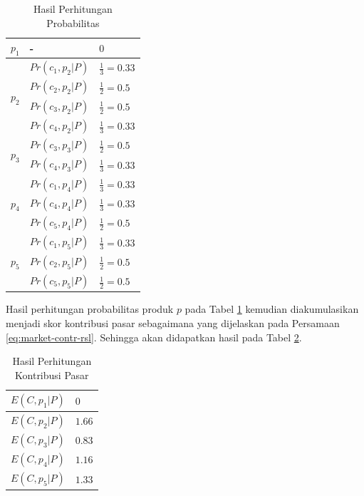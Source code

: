 \begin{small}
	\begin{longtable}{|p{1.5cm}|p{3cm}|p{2.5cm}|}
		\caption{Hasil Perhitungan Probabilitas}
		\label{tab:prob-res}
		\hline
		\multirow{1}{*}{$p_1$} & - & $0$ \\ \hline
		\multirow{4}{*}{$p_2$} & $Pr(c_1, p_2|P)$ & $\frac{1}{3} = 0.33$ \\ \cline{2-3}
		& $Pr(c_2, p_2|P)$ & $\frac{1}{2} = 0.5$ \\ \cline{2-3}
		& $Pr(c_3, p_2|P)$ & $\frac{1}{2} = 0.5$ \\ \cline{2-3}
		& $Pr(c_4, p_2|P)$ & $\frac{1}{3} = 0.33$  \\ \hline
		\multirow{2}{*}{$p_3$} & $Pr(c_3, p_3|P)$ & $\frac{1}{2} = 0.5$ \\ \cline{2-3}
		& $Pr(c_4, p_3|P)$ & $\frac{1}{3} = 0.33$  \\ \hline
		\multirow{3}{*}{$p_4$} & $Pr(c_1, p_4|P)$ & $\frac{1}{3} = 0.33$ \\ \cline{2-3}
		& $Pr(c_4, p_4|P)$ & $\frac{1}{3} = 0.33$  \\ \cline{2-3}
		& $Pr(c_5, p_4|P)$ & $\frac{1}{2} = 0.5$ \\ \hline
		\multirow{3}{*}{$p_5$} & $Pr(c_1, p_5|P)$ & $\frac{1}{3} = 0.33$ \\ \cline{2-3}
		& $Pr(c_2, p_5|P)$ & $\frac{1}{2} = 0.5$ \\ \cline{2-3}
		& $Pr(c_5, p_5|P)$ & $\frac{1}{2} = 0.5$ \\ \hline
	\end{longtable}
\end{small}


Hasil perhitungan probabilitas produk $p$ pada Tabel \ref{tab:prob-res} kemudian diakumulasikan menjadi skor kontribusi pasar sebagaimana yang dijelaskan pada Persamaan \ref{eq:market-contr-rsl}. Sehingga akan didapatkan hasil pada Tabel \ref{tab:mc-res}.

\begin{table}[H]
	\small
	\centering
	\begin{tabular}{|p{3cm}|p{2cm}|}
		\hline
		$E(C, p_1|P)$ & $0$ \\ \hline
		$E(C, p_2|P)$ & $1.66$ \\ \hline
		$E(C, p_3|P)$ & $0.83$ \\ \hline
		$E(C, p_4|P)$ & $1.16$ \\ \hline
		$E(C, p_5|P)$ & $1.33$ \\ \hline
	\end{tabular} 
	\caption{Hasil Perhitungan Kontribusi Pasar}
	\label{tab:mc-res}
\end{table}

